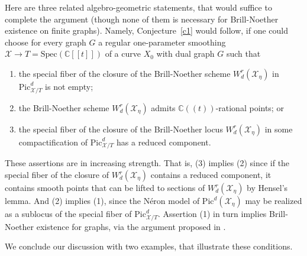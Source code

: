 \documentclass[11pt]{amsart}
\newcommand{\cX}{\mathcal X}
\begin{document}
Here are three related algebro-geometric statements, that would suffice to complete the argument (though none of them is necessary for Brill-Noether existence on finite graphs). Namely, Conjecture~\ref{c1} would follow, if one could choose for every graph $G$ a regular one-parameter smoothing $\cX \to T = \mathrm{Spec}(\mathbb C[[t]])$ of a curve $X_0$ with dual graph $G$ such that 
\begin{enumerate}
 \item the special fiber of the closure of the Brill-Noether scheme $W_{d}^r(\mathcal{X}_\eta)$ in $\mathrm{Pic}^d_{\cX/T}$ is not empty;
 \item the Brill-Noether scheme $W_d^r(\cX_\eta)$ admits $\mathbb C((t))$-rational points; or
 \item the special fiber of the closure of the Brill-Noether locus $W_{d}^r(\mathcal{X}_\eta)$ in some compactification of $\mathrm{Pic}^d_{\cX/T}$ has a reduced component. 
\end{enumerate}

These assertions are in increasing strength. That is, (3) implies (2) since if the special fiber of the closure of $W_d^r(\mathcal{X}_\eta)$ contains a reduced component, it contains smooth points that can be lifted to sections of $W_d^r(\cX_\eta)$ by Hensel's lemma. And (2) implies (1), since the Néron model of $\mathrm{Pic}^d(\cX_\eta)$ may be realized as a sublocus of the special fiber of $\mathrm{Pic}^d_{\cX/T}$. Assertion (1) in turn implies Brill-Noether existence for graphs, via the argument proposed in \cite[Theorem 6.3]{MR2895184}. 

We conclude our discussion with two examples, that illustrate these conditions.
\end{document}
